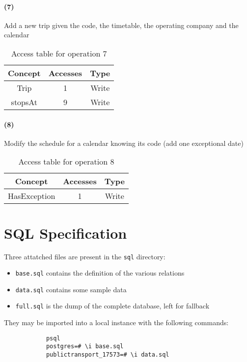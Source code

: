 \paragraph{(7)} Add a new trip given the code, the timetable, the operating company and the calendar

\begin{table}[h]
	\centering
	\begin{tabular}{|c|c|c|}
		\hline
		\textbf{Concept} & \textbf{Accesses} & \textbf{Type} \\
		\hline
		Trip & 1 & Write \\ \hline
		stopsAt & 9 & Write \\ \hline
	\end{tabular}
	\caption{Access table for operation 7}\label{tbl:rest.access-7}
\end{table}

\paragraph{(8)} Modify the schedule for a calendar knowing its code (add one exceptional date)
\begin{table}[h!]
	\centering
	\begin{tabular}{|c|c|c|}
		\hline
		\textbf{Concept} & \textbf{Accesses} & \textbf{Type} \\
		\hline
		HasException & 1 & Write \\ \hline
	\end{tabular}
	\caption{Access table for operation 8}\label{tbl:rest.access-8}
\end{table}

\section{SQL Specification}

	Three attatched files are present in the \texttt{sql} directory:
	\begin{itemize}[itemsep=0pt]
		\item \texttt{base.sql} contains the definition of the various relations
		\item \texttt{data.sql} contains some sample data
		\item \texttt{full.sql} is the dump of the complete database, left for fallback
	\end{itemize}

	They may be imported into a local instance with the following commands:
	\begin{center}
		\begin{lstlisting}
			psql
			postgres=# \i base.sql
			publictransport_17573=# \i data.sql
		\end{lstlisting}
	\end{center}


